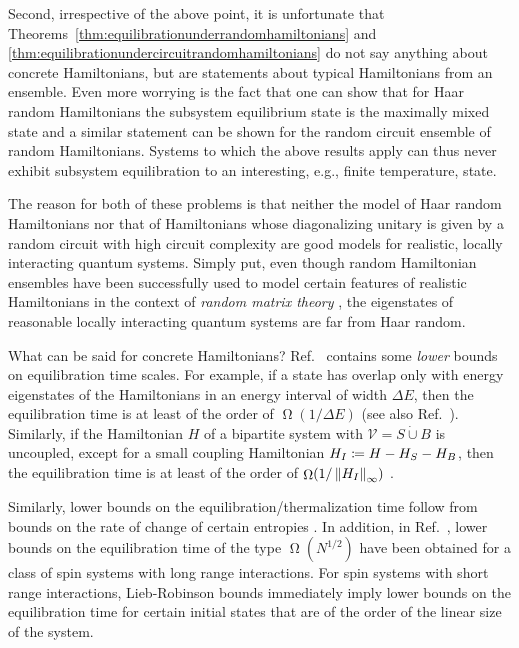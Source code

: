 \documentclass[a4paper,12pt,listof=totoc,index=totoc,bibliography=totoc,headsepline=false,headings=normal,BCOR16.153846mm,DIV12,headinclude,twoside,cleardoublepage=empty,numbers=noenddot,final]{scrreprt}
\theoremstyle{mystyle}
\numberwithin{equation}{section}
\numberwithin{figure}{section}
\numberwithin{lemma}{section}
\numberwithin{theorem}{section}
\numberwithin{corollary}{section}
\numberwithin{definition}{section}
\numberwithin{conjecture}{section}
\numberwithin{observation}{section}
\newcommand{\+}{\mkern2mu}
\newcommand{\coloneqq}{\mathrel{\vcentcolon\mkern-1.2mu=}} %
\newcommand{\dunion}{\mathbin{\dot{\cup}}}
\renewcommand{\H}{H}
\newcommand{\Vset}{\mathcal{V}}
\newcommand{\norm}[2][]{
  \ifthenelse{\equal{#1}{}}
    {\left\| {#2} \right\|}
    {\ifthenelse{\equal{#1}{uinv}}
      {\left\vert\kern-0.25ex\left\vert\kern-0.25ex\left\vert {#2} \right\vert\kern-0.25ex\right\vert\kern-0.25ex\right\vert}
      {\left\| {#2} \right\|_{#1}}
    }
}
\DeclareMathOperator{\landauOmega}{\Omega}
\DeclareMathOperator{\1}{\mathds{1}}
\begin{document}
Second, irrespective of the above point, it is unfortunate that Theorems~\ref{thm:equilibrationunderrandomhamiltonians} and \ref{thm:equilibrationundercircuitrandomhamiltonians} do not say anything about concrete Hamiltonians, but are statements about typical Hamiltonians from an ensemble.
Even more worrying is the fact that one can show that for Haar random Hamiltonians the subsystem equilibrium state is the maximally mixed state \cite[Corollary 1]{1112.5295v1} and a similar statement can be shown for the random circuit ensemble of random Hamiltonians. 
Systems to which the above results apply can thus never exhibit subsystem equilibration to an interesting, e.g., finite temperature, state.

The reason for both of these problems is that neither the model of Haar random Hamiltonians nor that of Hamiltonians whose diagonalizing unitary is given by a random circuit with high circuit complexity are good models for realistic, locally interacting quantum systems.
Simply put, even though random Hamiltonian ensembles have been successfully used to model certain features of realistic Hamiltonians in the context of \emph{random matrix theory} \cite{1102.0528v1,0412017v2,Guhr1998,1006.1634v1,Gemmer09,Tabor1989,Bohigas1984,Tao2012,mehta90}, the eigenstates of reasonable locally interacting quantum systems are far from Haar random.

What can be said for concrete Hamiltonians?
Ref.~\cite{Gogolin10-masterthesis} contains some \emph{lower} bounds on equilibration time scales.
For example, if a state has overlap only with energy eigenstates of the Hamiltonians in an energy interval of width $\Delta E$, then the equilibration time is at least of the order of $\landauOmega(1/\Delta E)$ (see also Ref.~\cite{PhysRevE.50.88}).
Similarly, if the Hamiltonian $\H$ of a bipartite system with $\Vset = S \dunion B$ is uncoupled, except for a small coupling Hamiltonian $H_I \coloneqq \H - \H_S - \H_B$, then the equilibration time is at least of the order of $\landauOmega(1/\norm[\infty]{\H_I})$ \cite[Section 2.6.3]{Gogolin10-masterthesis}.

Similarly, lower bounds on the equilibration/thermalization time follow from bounds on the rate of change of certain entropies \cite{MasterThesisHutter,Hutter11}.
In addition, in Ref.~\cite{Kastner11}, lower bounds on the equilibration time of the type $\landauOmega(N^{1/2})$ have been obtained for a class of spin systems with long range interactions.
For spin systems with short range interactions, Lieb-Robinson bounds immediately imply lower bounds on the equilibration time for certain initial states that are of the order of the linear size of the system.
\end{document}
